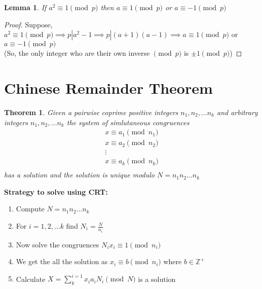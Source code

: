 \documentclass[12pt,a4paper]{article}
\newcommand{\Z}{\mathbb{Z}}
\newtheorem{thm}{Theorem}
\newtheorem{lem}{Lemma}
\begin{document}
\begin{lem}\normalfont
	If $a^2 \equiv 1 \pmod p$ then $a \equiv 1 \pmod p$ or $a \equiv -1 \pmod p$ 
\end{lem}
\begin{proof}
	Suppose,  $a^2 \equiv 1 \pmod p \implies p|a^2-1 \implies p|(a+1)(a-1) \implies a \equiv 1 \pmod p$ or $a \equiv -1 \pmod p$\\
	(So, the only integer who are their own inverse $\pmod p$ is $\pm 1 \pmod p$)
\end{proof}

\section{Chinese Remainder Theorem}
\begin{thm}\normalfont
	Given a pairwise coprime positive integers $n_{1},n_{2},\dots n_{k} $ and arbitrary integers $n_{1},n_{2},\dots n_{k} $ the system of simlutaneous congruences 
	\begin{align*}
		x \equiv a_{1} \pmod {n_{1}} \\
		x \equiv a_{2} \pmod {n_{2}} \\
		\vdots \\
		x \equiv a_{k} \pmod {n_{k}} \\
	\end{align*}
	has a solution and the solution is unique modulo $N=n_{1}n_{2}\dots n_{k}$
\end{thm}
\textbf{Strategy to solve using CRT:}\\
\begin{enumerate}
	\item Compute $N=n_{1}n_{2}\dots n_{k}$
	\item For $i=1,2,\dots k$ find $N_{i} = \frac{N}{n_{i}}$
	\item Now solve the congruences $N_{i}x_{i} \equiv 1 \pmod {n_{i}}$
	\item We get the all the solution as $x_{i} \equiv b \pmod {n_{i}}$ where $b \in \Z^{+}$
	\item Calculate $X = \sum_{k}^{i=1} x_{i}a_{i}N_{i} \pmod N$ is a solution 
\end{enumerate}
\end{document}
